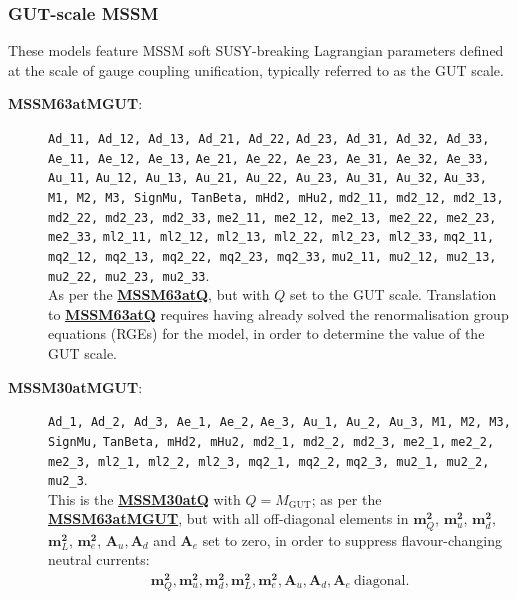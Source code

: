 \documentclass[pdftex,twocolumn,epjc3_preprint,runningheads]{svjour3}
\renewcommand{\_}{\discretionary{\underscore}{}{\underscore}}
\newcommand\term[1]{{\lstset{style=terminal}\lstinline!#1!\lstset{style=cpp}}}
\newcommand{\doublecrosssf}[2]{\hyperref[#2]{\textbf{\textsf{#1}}}}
\newcommand{\gsfitemc}[1]{\item[\textbf{\textsf{#1}}\label{#1}:]}
\begin{document}
\subsubsection{GUT-scale MSSM}

These models feature MSSM soft SUSY-breaking Lagrangian parameters defined at the scale of gauge coupling unification, typically referred to as the GUT scale.

\begin{description}

\gsfitemc{MSSM63atMGUT} \mbox{\term{Ad_11, Ad_12, Ad_13, Ad_21, Ad_22,}}
                        \term{Ad_23, Ad_31, Ad_32, Ad_33, Ae_11, Ae_12, Ae_13,}
                        \term{Ae_21, Ae_22, Ae_23, Ae_31, Ae_32, Ae_33, Au_11,}
                        \term{Au_12, Au_13, Au_21, Au_22, Au_23, Au_31, Au_32,}
                        \term{Au_33, M1, M2, M3, SignMu, TanBeta, mHd2, mHu2,}
                        \term{md2_11, md2_12, md2_13, md2_22, md2_23, md2_33,}
                        \term{me2_11, me2_12, me2_13, me2_22, me2_23, me2_33,}
                        \term{ml2_11, ml2_12, ml2_13, ml2_22, ml2_23, ml2_33,}
                        \term{mq2_11, mq2_12, mq2_13, mq2_22, mq2_23, mq2_33,}
                        \term{mu2_11, mu2_12, mu2_13, mu2_22, mu2_23, mu2_33}.\\
As per the \doublecrosssf{MSSM63atQ}{MSSM63atQ}, but with $Q$ set to the GUT scale.  Translation to \doublecrosssf{MSSM63atQ}{MSSM63atQ} requires having already solved the renormalisation group equations (RGEs) for the model, in order to determine the value of the GUT scale.\vspace{2mm}

\gsfitemc{MSSM30atMGUT} \term{Ad_1, Ad_2, Ad_3, Ae_1, Ae_2,}
                        \term{Ae_3, Au_1, Au_2, Au_3, M1, M2, M3, SignMu,}
                        \term{TanBeta, mHd2, mHu2, md2_1, md2_2, md2_3, me2_1,}
                        \term{me2_2, me2_3, ml2_1, ml2_2, ml2_3, mq2_1, mq2_2,}
                        \term{mq2_3, mu2_1, mu2_2, mu2_3}.\\
This is the \doublecrosssf{MSSM30atQ}{MSSM30atQ} with $Q=M_\mathrm{GUT}$; as per the \doublecrosssf{MSSM63atMGUT}{MSSM63atMGUT}, but with all off-diagonal elements in $\mathbf{m}^\mathbf{2}_Q$, $\mathbf{m}^\mathbf{2}_u$, $\mathbf{m}^\mathbf{2}_d$, $\mathbf{m}^\mathbf{2}_L$, $\mathbf{m}^\mathbf{2}_e$, $\mathbf{A}_u, \mathbf{A}_d$ and $\mathbf{A}_e$ set to zero, in order to suppress flavour-changing neutral currents:
\begin{align}
\mathbf{m}^\mathbf{2}_Q, \mathbf{m}^\mathbf{2}_u, \mathbf{m}^\mathbf{2}_d, \mathbf{m}^\mathbf{2}_L, \mathbf{m}^\mathbf{2}_e, \mathbf{A}_u, \mathbf{A}_d, \mathbf{A}_e\ \mathrm{diagonal}.
\end{align}


\end{description}
\end{document}
